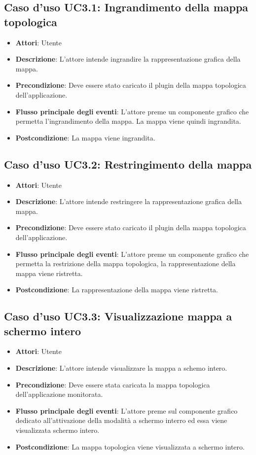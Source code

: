 \subsection{Caso d'uso UC3.1: Ingrandimento della mappa topologica}
\begin{itemize}
	\item \textbf{Attori}: Utente
	\item \textbf{Descrizione}: L'attore intende ingrandire la rappresentazione grafica della mappa.
	\item \textbf{Precondizione}: Deve essere stato caricato il plugin della mappa topologica dell'applicazione.
	\item \textbf{Flusso principale degli eventi}: L'attore preme un componente grafico che permetta l'ingrandimento della mappa. La mappa viene quindi ingrandita.
	\item \textbf{Postcondizione}: La mappa viene ingrandita.
\end{itemize}
\subsection{Caso d'uso UC3.2: Restringimento della mappa}
\begin{itemize}
	\item \textbf{Attori}: Utente
	\item \textbf{Descrizione}: L'attore intende restringere la rappresentazione grafica della mappa.
	\item \textbf{Precondizione}: Deve essere stato caricato il plugin della mappa topologica dell'applicazione.
	\item \textbf{Flusso principale degli eventi}: L'attore preme un componente grafico che permetta la restrizione della mappa topologica, la rappresentazione della mappa viene ristretta.
	\item \textbf{Postcondizione}: La rappresentazione della mappa viene ristretta.
\end{itemize}
\subsection{Caso d'uso UC3.3: Visualizzazione mappa a schermo intero}
\begin{itemize}
	\item \textbf{Attori}: Utente
	\item \textbf{Descrizione}: L'attore intende visualizzare la mappa a schemo intero.
	\item \textbf{Precondizione}: Deve essere stata caricata la mappa topologica dell'applicazione monitorata.
	\item \textbf{Flusso principale degli eventi}: L'attore preme sul componente grafico dedicato all'attivazione della modalità a schermo interro ed essa viene visualizzata schermo intero.
	\item \textbf{Postcondizione}: La mappa topologica viene visualizzata a schermo intero.
\end{itemize}
